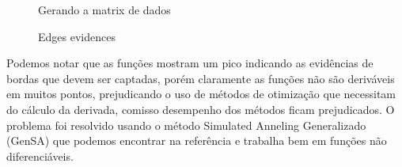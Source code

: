 \documentclass[conference]{IEEEtran}
\begin{document}
   
   \begin{figure}[hbt]
	\centering
      Gerando a matrix de dados
	   \caption{Edges evidences}
     \label{fig_evid_bordas}
   \end{figure}	
	
	Podemos notar que as funções mostram um pico indicando as evidências de bordas que devem ser captadas, porém claramente as funções não são deriváveis em muitos pontos, prejudicando o uso de métodos de otimização que necessitam do cálculo da derivada, comisso desempenho dos métodos ficam prejudicados. O problema foi resolvido usando o método Simulated Anneling Generalizado (GenSA) que podemos encontrar na referência \cite{xgsh} e trabalha bem em funções não diferenciáveis.
	
\end{document}
